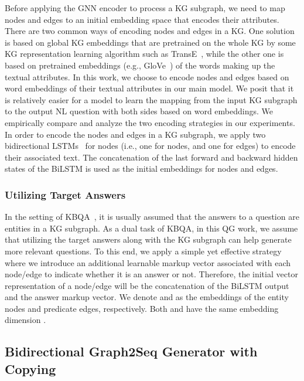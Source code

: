 \documentclass[journal]{IEEEtran}
\begin{document}
Before applying the GNN encoder to process a KG subgraph, 
we need to map nodes and edges to an initial embedding space that encodes their attributes.
There are two common ways of encoding nodes and edges in a KG.
One solution is based on global KG embeddings that are pretrained on the whole KG by some 
KG representation learning algorithm such as TransE~\cite{bordes2013translating},
while the other one is based on pretrained embeddings (e.g., GloVe~\cite{pennington2014glove}) of the words making up the textual attributes.
In this work, we choose to encode nodes and edges based on word embeddings of their textual attributes in our main model.
We posit that it is relatively easier for a model to learn the mapping from the input KG subgraph to the output NL question with both sides based on word embeddings.
We empirically compare and analyze the two encoding strategies in our experiments.
In order to encode the nodes and edges in a KG subgraph,
we apply two bidirectional LSTMs~\cite{hochreiter1997long} 
for nodes 
(i.e., one for nodes, and one for edges) to encode their associated text.
The concatenation of the last forward and backward hidden states of the BiLSTM is used as the initial embeddings for nodes and edges.






\subsubsection{Utilizing Target Answers}

In the setting of KBQA~\cite{chen2019bidirectional,haussmann2019foodkg}, it is usually assumed that the answers to a question are entities in a KG subgraph. 
As a dual task of KBQA, in this QG work, 
we assume that utilizing the target answers along with the KG subgraph can help generate more relevant questions.
To this end, we apply a simple yet effective strategy 
where we introduce an additional learnable markup vector associated with each node/edge to indicate whether it is an answer or not.
Therefore, the initial vector representation of a node/edge will be the concatenation of the BiLSTM output and the answer markup vector.
We denote  and  as the embeddings of the entity nodes and predicate edges, respectively.
Both  and  have the same embedding dimension .







\subsection{Bidirectional Graph2Seq Generator with Copying}
\end{document}
